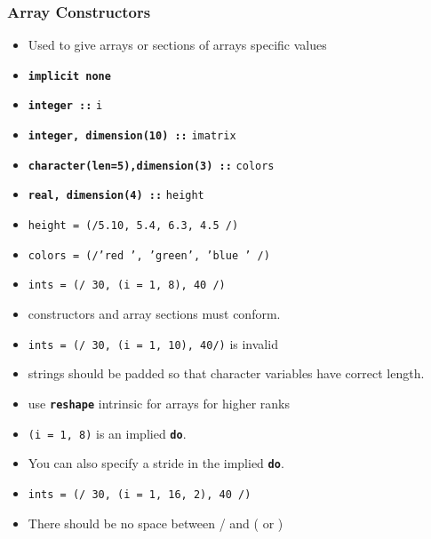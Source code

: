 \documentclass[slidestop,mathserif,compress,xcolor=svgnames]{beamer}
\newenvironment{bblock}[0]
{
\begin{beamerboxesrounded}[upper=uppercol1,lower=lowercol1,shadow=true]}
{\end{beamerboxesrounded}}
\begin{document}
\begin{frame}
  \frametitle{\small Array Constructors}
  \begin{itemize}
    \item Used to give arrays or sections of arrays specific values
  \end{itemize}
  \begin{bblock}{}
    {\tiny
      \begin{itemize}
        \item[] \textbf{\texttt{implicit none}}
        \item[] \textbf{\texttt{integer ::}} \texttt{i}
        \item[] \textbf{\texttt{integer, dimension(10) ::}} \texttt{imatrix}
        \item[] \textbf{\texttt{character(len=5),dimension(3) ::}} \texttt{colors}
        \item[] \textbf{\texttt{real, dimension(4) ::}} \texttt{height}
        \item[] \texttt{height = (/5.10, 5.4, 6.3, 4.5 /)}
        \item[] \texttt{colors = (/'red  ', 'green', 'blue ' /)}
        \item[] \texttt{ints = (/ 30, (i = 1, 8), 40 /)}
      \end{itemize}
      }
  \end{bblock}
  \begin{itemize}
    \item constructors and array sections must conform.
    \item[] \texttt{ints = (/ 30, (i = 1, 10), 40/)} is invalid
    \item strings should be padded so that character variables have correct length.
    \item use \textbf{\texttt{reshape}} intrinsic for arrays for higher ranks
    \item \texttt{(i = 1, 8)} is an implied \textbf{\texttt{do}}.
    \item You can also specify a stride in the implied \textbf{\texttt{do}}.
    \item[] \texttt{ints = (/ 30, (i = 1, 16, 2), 40 /)}
    \item {\color{red}There should be no space between / and ( or )}
  \end{itemize}
\end{frame}
\end{document}
